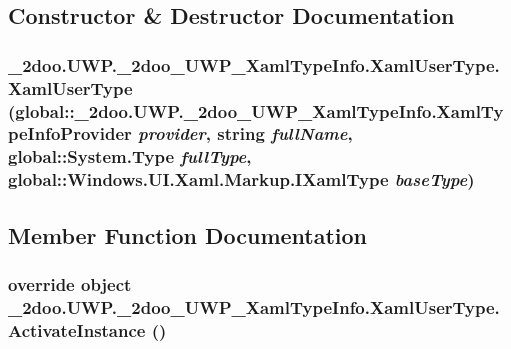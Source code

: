 \subsection{Constructor \& Destructor Documentation}
\hypertarget{class__2doo_1_1_u_w_p_1_1__2doo___u_w_p___xaml_type_info_1_1_xaml_user_type_60424f36d4f7ce95134441bf4ed6a759}{
\subsubsection[{XamlUserType}]{\setlength{\rightskip}{0pt plus 5cm}\_\-2doo.UWP.\_\-2doo\_\-UWP\_\-XamlTypeInfo.XamlUserType.XamlUserType (global::\_\-2doo.UWP.\_\-2doo\_\-UWP\_\-XamlTypeInfo.XamlTypeInfoProvider {\em provider}, \/  string {\em fullName}, \/  global::System.Type {\em fullType}, \/  global::Windows.UI.Xaml.Markup.IXamlType {\em baseType})}}
\label{class__2doo_1_1_u_w_p_1_1__2doo___u_w_p___xaml_type_info_1_1_xaml_user_type_60424f36d4f7ce95134441bf4ed6a759}




\subsection{Member Function Documentation}
\hypertarget{class__2doo_1_1_u_w_p_1_1__2doo___u_w_p___xaml_type_info_1_1_xaml_user_type_d1544459aab36824fcdc51b0a0150cfd}{
\subsubsection[{ActivateInstance}]{\setlength{\rightskip}{0pt plus 5cm}override object \_\-2doo.UWP.\_\-2doo\_\-UWP\_\-XamlTypeInfo.XamlUserType.ActivateInstance ()}}
\label{class__2doo_1_1_u_w_p_1_1__2doo___u_w_p___xaml_type_info_1_1_xaml_user_type_d1544459aab36824fcdc51b0a0150cfd}


